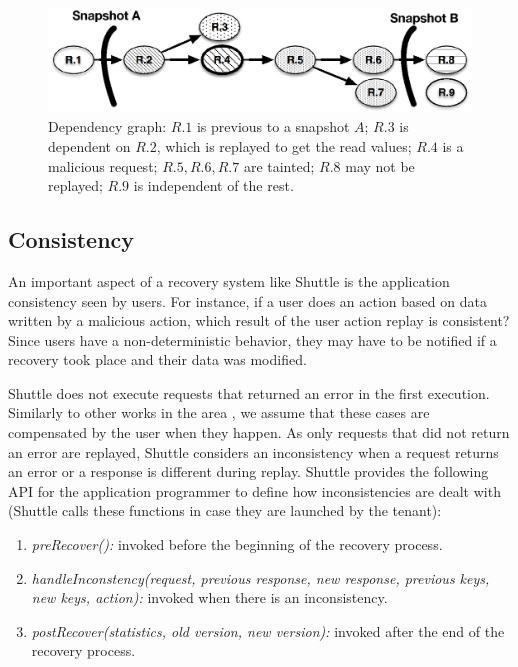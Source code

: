 \begin{figure}
  \centering
  \includegraphics[width=\linewidth]{images/selectiveDependency}
  \caption{{Dependency graph:} $R.1$ is previous to a snapshot $A$; $R.3$ is dependent on $R.2$, which is replayed to get the read values; $R.4$ is a malicious request; $R.5,R.6,R.7$ are tainted; $R.8$ may not be replayed; $R.9$ is independent of the rest.}
  \label{fig:selectiveGraph}
\end{figure}


\subsection{Consistency}
\label{sec:recovery:consistency}

An important aspect of a recovery system like Shuttle is the application consistency seen by users. For instance, if a user does an action based on data written by a malicious action, which result of the user action replay is consistent? Since users have a non-deterministic behavior, they may have to be notified if a recovery took place and their data was modified.

Shuttle does not execute requests that returned an error in the first execution. Similarly to other works in the area \cite{undoForOperators}, we assume that these cases are compensated by the user when they happen. As only requests that did not return an error are replayed, Shuttle considers an inconsistency when a request returns an error or a response is different during replay. Shuttle provides the following API for the application programmer to define how inconsistencies are dealt with (Shuttle calls these functions in case they are launched by the tenant):
\begin{enumerate}
  \item \textit{preRecover():} invoked before the beginning of the recovery process.
  \item \textit{handleInconstency(request, previous response, new response, previous keys, new keys, action):} invoked when there is an inconsistency.
  \item \textit{postRecover(statistics, old version, new version):} invoked after the end of the recovery process.
\end{enumerate}

